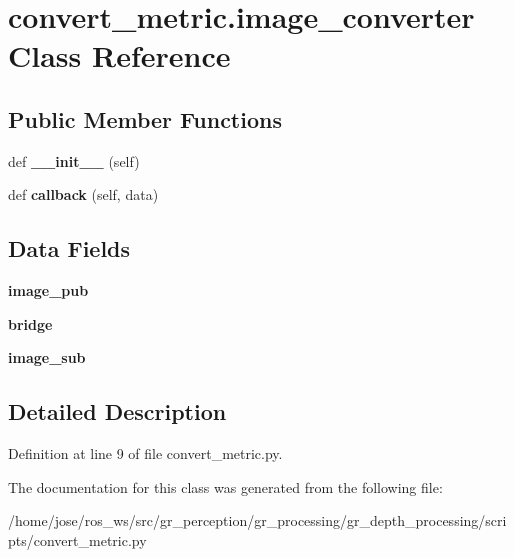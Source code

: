\hypertarget{classconvert__metric_1_1image__converter}{}\section{convert\+\_\+metric.\+image\+\_\+converter Class Reference}
\label{classconvert__metric_1_1image__converter}
\subsection*{Public Member Functions}
\begin{DoxyCompactItemize}
\item 
\mbox{\label{classconvert__metric_1_1image__converter_a2317584225874eb7762587d19814637e}} 
def {\bfseries \+\_\+\+\_\+init\+\_\+\+\_\+} (self)
\item 
\mbox{\label{classconvert__metric_1_1image__converter_a01784379e41e137ba334c4d741496b23}} 
def {\bfseries callback} (self, data)
\end{DoxyCompactItemize}
\subsection*{Data Fields}
\begin{DoxyCompactItemize}
\item 
\mbox{\label{classconvert__metric_1_1image__converter_af4a4d511b1d1ee1fe405830572b62cc2}} 
{\bfseries image\+\_\+pub}
\item 
\mbox{\label{classconvert__metric_1_1image__converter_ae3dffd30179a2912f94f106d3d1b92a0}} 
{\bfseries bridge}
\item 
\mbox{\label{classconvert__metric_1_1image__converter_a952d7866b7a8b9e017c95d17e16b7ef0}} 
{\bfseries image\+\_\+sub}
\end{DoxyCompactItemize}


\subsection{Detailed Description}


Definition at line 9 of file convert\+\_\+metric.\+py.



The documentation for this class was generated from the following file\+:\begin{DoxyCompactItemize}
\item 
/home/jose/ros\+\_\+ws/src/gr\+\_\+perception/gr\+\_\+processing/gr\+\_\+depth\+\_\+processing/scripts/convert\+\_\+metric.\+py\end{DoxyCompactItemize}
